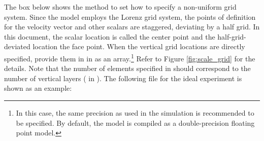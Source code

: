 The box below shows the method to set how to specify a non-uniform grid system.
Since the model employs the Lorenz grid system, the points of definition for the velocity vector and other scalars are staggered, deviating by a half grid.
In this document, the scalar location is called the center point and the half-grid-deviated location the face point.
When the vertical grid locations are directly specified, provide them in  in  as an array.\footnote{In this case, the same precision as used in the simulation is recommended to be specified. By default, the model is compiled as a double-precision floating point model.} Refer to Figure \ref{fig:scale_grid} for the details. Note that the number of elements specified in  should correspond to the number of vertical layers ( in ). The following file for the ideal experiment is shown as an example:


